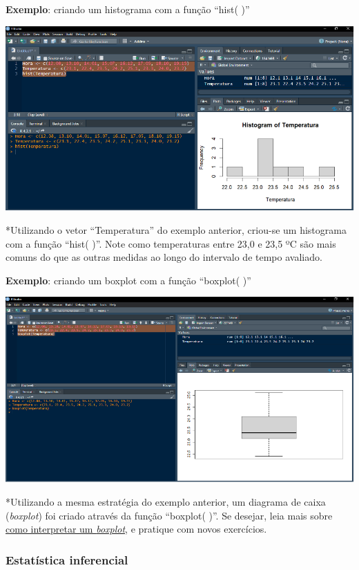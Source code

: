 \documentclass[
]{book}
\begin{document}
\textbf{Exemplo}: criando um histograma com a função ``hist( )''

\includegraphics{images/clipboard-680965483.png}

*Utilizando o vetor ``Temperatura'' do exemplo anterior, criou-se um histograma com a função ``hist( )''. Note como temperaturas entre 23,0 e 23,5 ºC são mais comuns do que as outras medidas ao longo do intervalo de tempo avaliado.

\textbf{Exemplo}: criando um boxplot com a função ``boxplot( )''

\includegraphics{images/clipboard-1951655399.png}

*Utilizando a mesma estratégia do exemplo anterior, um diagrama de caixa (\emph{boxplot}) foi criado através da função ``boxplot( )''. Se desejar, leia mais sobre \href{https://statplace.com.br/blog/como-interpretar-um-boxplot/}{como interpretar um \emph{boxplot}}, e pratique com novos exercícios.

\subsubsection{Estatística inferencial}\label{estatuxedstica-inferencial}
\end{document}
